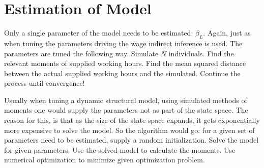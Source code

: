 \section{Estimation of Model}

Only a single parameter of the model needs to be estimated: $\beta_L$. Again, just as when tuning the parameters driving the wage indirect inference is used. The parameters are tuned the following way. Simulate $N$ individuals. Find the relevant moments of supplied working hours. Find the mean squared distance between the actual supplied working hours and the simulated. Continue the process until convergence!

Usually when tuning a dynamic structural model, using simulated methods of moments one would supply the parameters not as part of the state space. The reason for this, is that as the size of the state space expands, it gets exponentially more expensive to solve the model. So the algorithm would go: for a given set of parameters need to be estimated, supply a random initialization. Solve the model for given parameters. Use the solved model to calculate the moments. Use numerical optimization to minimize given optimization problem.

